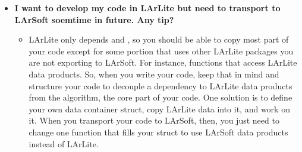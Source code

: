 \begin{itemize}
\item[] {\bf I want to develop my code in LArLite but need to transport to LArSoft soemtime in future. Any tip?}
  \begin{itemize}
    \item LArLite only depends \ROOT and \CPP, so you should be able to copy most part of your code except for some portion that uses other LArLite packages you are not exporting to LArSoft. For instance, functions that access LArLite data products. So, when you write your code, keep that in mind and structure your code to decouple a dependency to LArLite data products from the algorithm, the core part of your code. One solution is to define your own data container \CPP struct, copy LArLite data into it, and work on it. When you transport your code to LArSoft, then, you just need to change one function that fills your \CPP struct to use LArSoft data products instead of LArLite.
  \end{itemize}

\end{itemize}
